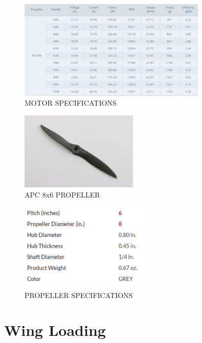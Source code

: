 \documentclass[12 pt]{article}
\begin{document}
\begin{figure}[h]
    \centering
    \includegraphics[width=0.8\textwidth]{motor specifications.png}
    \caption{MOTOR SPECIFICATIONS}
    \label{fig:motor_specifications}
\end{figure}


\begin{figure}[h]
    \centering
    \includegraphics[width=0.5\textwidth]{propeller.jpg}
    \caption{APC 8x6 PROPELLER}
    \label{fig:propeller}
\end{figure}

\begin{figure}[h]
    \centering
    \includegraphics[width=0.6\textwidth]{propeller specifications.png}
    \caption{PROPELLER SPECIFICATIONS}
    \label{fig:propeller_specifications}
\end{figure}

\newpage

\clearpage


\section{Wing Loading}
\end{document}

